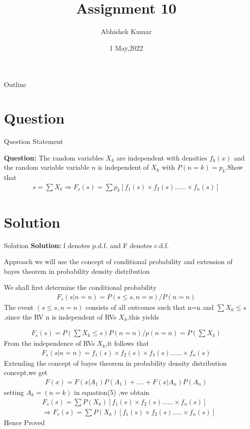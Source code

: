 \documentclass{beamer}
\title{Assignment 10}
\author{Abhishek Kumar}
\institute{IIT Hyderabad}
\date{1 May,2022}
\begin{document}
	\begin{frame}
		\titlepage
	\end{frame}
	\begin{frame}{Outline}
		\tableofcontents
	\end{frame}
	\section{Question}
	\begin{frame}{Question Statement}
		
		\textbf{Question:} The random variables ${X_k}$ are independent with densities $f_k(x)$ and the random variable variable $n$ is independent of $X_k$ with $P(n=k)=p_k$.Show that
		\begin{align}
			s=\sum X_k   \Rightarrow   F_s(s)=\sum p_k[f_1(s) \times f_2(s) ...... \times f_n(s)]
		\end{align}
	\end{frame}
	\section{Solution}
	\begin{frame}{Solution}
		\textbf{Solution:}
		f denotes p.d.f. and F denotes c.d.f.
		\begin{alertblock}{Approach}
			we will use the concept of conditional probability and extension of bayes theorem in probability density distribution
		\end{alertblock}
		We shall first determine the conditional probability
		\begin{align}
			F_s(s|n=n)=P(s \leq s,n=n)/P(n=n)
		\end{align}
		The event $(s \leq s,n=n)$ consists of all outcomes such that n=n and $\sum X_k \leq s$.since the RV n is independent of RVs $X_k$,this yields 
	\end{frame}
	\begin{frame}
		\begin{align}
			F_s(s)=P(\sum X_k \leq s)P(n=n)/p(n=n)=P(\sum X_k)
		\end{align}
		From the independence of RVs $X_k$,it follows that 
		\begin{align}
			F_s(s|n=n)=f_1(s) \times f_2(s) \times f_3(s) ...... \times f_n(s)
		\end{align}
		Extending the concept of bayes theorem in probability density distribution concept,we get
		\begin{align}
			F(x)=F(x|A_1)P(A_1)+....+F(x|A_n)P(A_n)
		\end{align}
		setting $A_k=(n=k)$ in equation(5) ,we obtain
		\begin{align}
			&F_s(s)=\sum P(X_k)[f_1(s) \times f_2(s) ...... \times f_n(s)]\\
			&\Rightarrow F_s(s)=\sum P(X_k)[f_1(s) \times f_2(s) ..... \times f_n(s)]
		\end{align}
		Hence Proved
	\end{frame}
	
\end{document}
